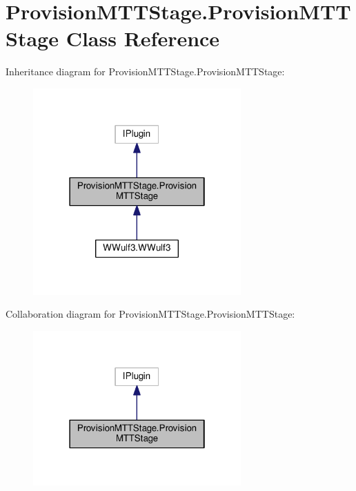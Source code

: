 \hypertarget{class_provision_m_t_t_stage_1_1_provision_m_t_t_stage}{\section{Provision\-M\-T\-T\-Stage.\-Provision\-M\-T\-T\-Stage Class Reference}
\label{class_provision_m_t_t_stage_1_1_provision_m_t_t_stage}
}


Inheritance diagram for Provision\-M\-T\-T\-Stage.\-Provision\-M\-T\-T\-Stage\-:
\nopagebreak
\begin{figure}[H]
\begin{center}
\leavevmode
\includegraphics[width=226pt]{class_provision_m_t_t_stage_1_1_provision_m_t_t_stage__inherit__graph}
\end{center}
\end{figure}


Collaboration diagram for Provision\-M\-T\-T\-Stage.\-Provision\-M\-T\-T\-Stage\-:
\nopagebreak
\begin{figure}[H]
\begin{center}
\leavevmode
\includegraphics[width=226pt]{class_provision_m_t_t_stage_1_1_provision_m_t_t_stage__coll__graph}
\end{center}
\end{figure}

